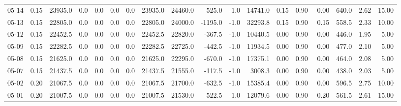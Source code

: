 \begin{threeparttable}
{\begin{tabular}{lrrrrrrrrrrrrrrrrr}
  05-14 &     0.15 & 23935.0 &               0.0 &               0.0 &                0.0 &                0.0 & 23935.0 & 24460.0 &     -525.0 &                     -1.0 &             14741.0 &       0.15 &      0.90 &           0.00 &            640.0 &            2.62 &                  15.00 \\
  05-13 &     0.15 & 22805.0 &               0.0 &               0.0 &                0.0 &                0.0 & 22805.0 & 24000.0 &    -1195.0 &                     -1.0 &             32293.8 &       0.15 &      0.90 &           0.15 &            558.5 &            2.33 &                  10.00 \\
  05-12 &     0.15 & 22452.5 &               0.0 &               0.0 &                0.0 &                0.0 & 22452.5 & 22820.0 &     -367.5 &                     -1.0 &             10440.5 &       0.00 &      0.90 &           0.00 &            446.0 &            1.95 &                   5.00 \\
  05-09 &     0.15 & 22282.5 &               0.0 &               0.0 &                0.0 &                0.0 & 22282.5 & 22725.0 &     -442.5 &                     -1.0 &             11934.5 &       0.00 &      0.90 &           0.00 &            477.0 &            2.10 &                   5.00 \\
  05-08 &     0.15 & 21625.0 &               0.0 &               0.0 &                0.0 &                0.0 & 21625.0 & 22295.0 &     -670.0 &                     -1.0 &             17375.1 &       0.00 &      0.90 &           0.00 &            464.0 &            2.08 &                   5.00 \\
  05-07 &     0.15 & 21437.5 &               0.0 &               0.0 &                0.0 &                0.0 & 21437.5 & 21555.0 &     -117.5 &                     -1.0 &              3008.3 &       0.00 &      0.90 &           0.00 &            438.0 &            2.03 &                   5.00 \\
  05-02 &     0.20 & 21067.5 &               0.0 &               0.0 &                0.0 &                0.0 & 21067.5 & 21700.0 &     -632.5 &                     -1.0 &             15385.4 &       0.00 &      0.90 &           0.00 &            596.5 &            2.75 &                  10.00 \\
  05-01 &     0.20 & 21007.5 &               0.0 &               0.0 &                0.0 &                0.0 & 21007.5 & 21530.0 &     -522.5 &                     -1.0 &             12079.6 &       0.00 &      0.90 &          -0.20 &            561.5 &            2.61 &                  15.00 \\

\end{tabular}}
\end{threeparttable}
